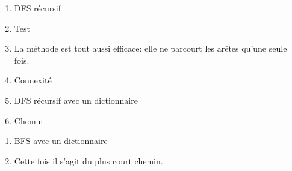 \documentclass[a4paper,11pt]{article}
\begin{document}
\begin{Form}
\begin{exo}
\begin{enumerate}
\end{enumerate}
\end{exo}
\begin{exo}
\begin{enumerate}
\item DFS récursif

\item Test
\item La méthode est tout aussi efficace: elle ne parcourt les arêtes qu'une seule fois.
\item Connexité

\item DFS récursif avec un dictionnaire

\item Chemin

\end{enumerate}
\end{exo}
\begin{exo}
\begin{enumerate}
\item BFS avec un dictionnaire

\item Cette fois il s'agit du plus court chemin.

\end{enumerate}
\end{exo}
\end{Form}
\end{document}
